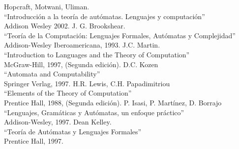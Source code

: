 \documentclass[12pt,a4paper,spanish]{book}
\begin{document}
\begin{thebibliography}{XXX}
\bibitem{}Hopcraft, Motwani, Uliman.\\
``Introducci\'on a la teor\'ia de aut\'omatas. Lenguajes y computaci\'on''\\
Addison Wesley 2002.
\bibitem{}J. G. Brookshear.\\
``Teor\'ia de la Computaci\'on: Lenguajes Formales, Aut\'omatas y Complejidad''\\
Addison-Wesley Iberoamericana, 1993.
\bibitem{}J.C. Martin.\\
``Introduction to Languages and the Theory of Computation''\\
McGraw-Hill, 1997, (Segunda edici\'on).
\bibitem{}D.C. Kozen\\
``Automata and Computability''\\
Springer Verlag, 1997.
\bibitem{}H.R. Lewis, C.H. Papadimitriou\\
``Elements of the Theory of Computation''\\
Prentice Hall, 1988, (Segunda edici\'on).
\bibitem{}P. Isasi, P. Mart\'inez, D. Borrajo\\
``Lenguajes, Gram\'aticas y Aut\'omatas, un enfoque pr\'actico''\\
Addison-Wesley, 1997.
\bibitem{}Dean Kelley.\\
``Teor\'ia de Aut\'omatas y Lenguajes Formales''\\
Prentice Hall, 1997.
\bibitem{}
\end{thebibliography}
\end{document}
